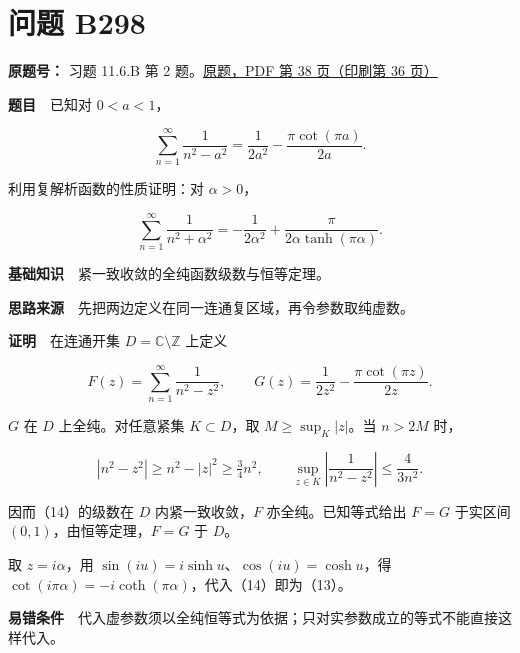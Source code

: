 \documentclass[11pt,a4paper]{article}
\begin{document}
\section{问题 B298}\label{ux95eeux9898-b298}

\textbf{原题号：} 习题 11.6.B 第 2
题。\href{https://zj139.github.io/math-notes/files/problems/楼分析习题-v2.pdf\#page=38}{原题，PDF
第 38 页（印刷第 36 页）}

\textbf{题目}　已知对 \(0<a<1\)，

\begin{equation}
\sum_{n=1}^{\infty}\frac1{n^2-a^2}
=\frac1{2a^2}-\frac{\pi\cot(\pi a)}{2a}.
\tag{12}
\end{equation}

利用复解析函数的性质证明：对 \(\alpha>0\)，

\begin{equation}
\sum_{n=1}^{\infty}\frac1{n^2+\alpha^2}
=-\frac1{2\alpha^2}+\frac{\pi}{2\alpha\tanh(\pi\alpha)}.
\tag{13}
\end{equation}

\textbf{基础知识}　紧一致收敛的全纯函数级数与恒等定理。

\textbf{思路来源}　先把两边定义在同一连通复区域，再令参数取纯虚数。

\textbf{证明}　在连通开集 \(D=\mathbb C\setminus\mathbb Z\) 上定义

\begin{equation}
F(z)=\sum_{n=1}^{\infty}\frac1{n^2-z^2},\qquad
G(z)=\frac1{2z^2}-\frac{\pi\cot(\pi z)}{2z}.
\tag{14}
\end{equation}

\(G\) 在 \(D\) 上全纯。对任意紧集 \(K\subset D\)，取
\(M\ge\sup_K|z|\)。当 \(n>2M\) 时，

\begin{equation}
|n^2-z^2|\ge n^2-|z|^2\ge\tfrac34n^2,
\qquad \sup_{z\in K}\left|\frac1{n^2-z^2}\right|\le\frac4{3n^2}.
\tag{15}
\end{equation}

因而（14）的级数在 \(D\) 内紧一致收敛，\(F\) 亦全纯。已知等式给出
\(F=G\) 于实区间 \((0,1)\)，由恒等定理，\(F=G\) 于 \(D\)。

取 \(z=i\alpha\)，用 \(\sin(iu)=i\sinh u\)、\(\cos(iu)=\cosh u\)，得
\(\cot(i\pi\alpha)=-i\coth(\pi\alpha)\)，代入（14）即为（13）。

\textbf{易错条件}　代入虚参数须以全纯恒等式为依据；只对实参数成立的等式不能直接这样代入。
\end{document}
